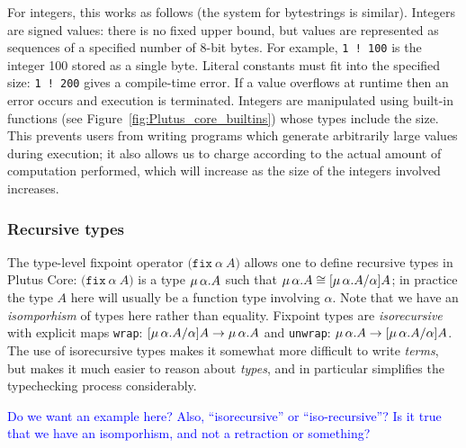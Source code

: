 \documentclass[a4paper]{article}
\newcommand{\blue}[1]{\textcolor{blue}{#1}}
\newcommand{\keyword}[1]{\texttt{#1}}
\newcommand{\construct}[1]{\texttt{(} #1 \texttt{)}}
\newcommand{\fixT}[2]{\construct{\keyword{fix} ~ #1 ~ #2}}
\begin{document}
For integers, this works as follows (the system for 
bytestrings is similar).  Integers are signed values:
there is no fixed upper bound, but values are represented as sequences
of a specified number of 8-bit bytes.  For example, \texttt{1~!~100}
is the integer 100 stored as a single byte.  Literal constants must
fit into the specified size: \texttt{1~!~200} gives a compile-time
error. If a value overflows at runtime then an error occurs and
execution is terminated.  Integers are manipulated using built-in
functions (see Figure~\ref{fig:Plutus_core_builtins}) whose types
include the size. This prevents users from writing programs which
generate arbitrarily large values during execution; it also allows us
to charge according to the actual amount of computation performed,
which will increase as the size of the integers involved increases.


\subsubsection{Recursive types}
The type-level fixpoint operator $\fixT{\alpha}{A}$ allows one to
define recursive types in Plutus Core: $\fixT{\alpha}{A}$ is a type
$\mu\,\alpha.A$ such that $\mu\,\alpha.A \cong [\mu\,\alpha.A/\alpha]A$; in
practice the type $A$ here will usually be a function type involving
$\alpha$.  Note that we have an \textit{isomporhism} of types here
rather than equality.  Fixpoint types are
\textit{isorecursive}~\cite[20.2]{Pierce:TAPL} with explicit maps
\texttt{wrap}: $[\mu\,\alpha.A/\alpha]A \rightarrow \mu\,\alpha.A$ and
\texttt{unwrap}: $\mu\,\alpha.A \rightarrow [\mu\,\alpha.A/\alpha]A$.
The use of isorecursive types makes it somewhat more difficult to
write \textit{terms}, but makes it much easier to reason about
\textit{types}, and in particular simplifies the typechecking process
considerably.

\noindent\blue{Do we want an example here?  Also, ``isorecursive'' or ``iso-recursive''? 
Is it true that we have an isomporhism, and not a retraction or something?}


%
\end{document}
